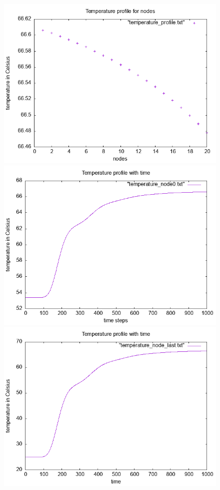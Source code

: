 \documentclass{article}
\begin{document}
\begin{figure}[ht]
\centering
\includegraphics[scale = 0.5]{temperature_profile_N_20_U_0.png}
\includegraphics[scale =0.5]{temperature_node0_N_20_U_0.png}
\includegraphics[scale =0.5]{temperature_node_last_N_20_U_0.png}

\end{figure}
\end{document}
